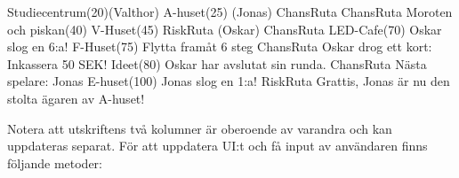 \begin{REPL}
Studiecentrum(20)(Valthor)
A-huset(25) (Jonas)                                                                                                          
ChansRuta                                                                                                             
ChansRuta                                                                                                              
Moroten och piskan(40)
V-Huset(45)                                                                                                        
RiskRuta (Oskar)                                                                                                         
ChansRuta                                                                                                        
LED-Cafe(70)               Oskar slog en 6:a!                                           
F-Huset(75)                Flytta framåt 6 steg                                        
ChansRuta                  Oskar drog ett kort: Inkassera 50 SEK!
Ideet(80)                  Oskar har avslutat sin runda.                              
ChansRuta                  Nästa spelare: Jonas                                      
E-huset(100)               Jonas slog en 1:a!                                       
RiskRuta                   Grattis, Jonas är nu den stolta ägaren av A-huset!
\end{REPL}

Notera att utskriftens två kolumner är oberoende av varandra och kan uppdateras separat. För att uppdatera UI:t och få input av användaren finns följande metoder:
